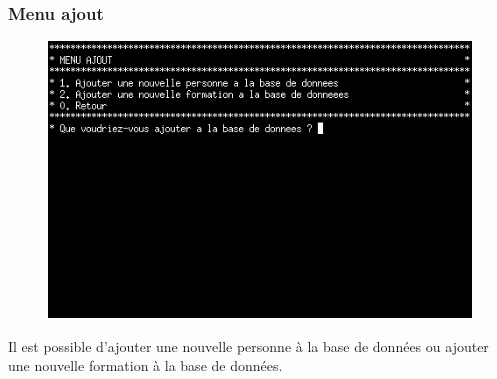 \documentclass[11pt]{article}
\begin{document}
\newpage
\subsubsection{Menu ajout}
\begin{figure}[ht]
  \centering
  \includegraphics[trim=0 210 0 0, clip, width=\textwidth]{images/06.png}
\end{figure}
Il est possible d'ajouter une nouvelle personne à la base de données ou ajouter une nouvelle formation à la base de données.
\end{document}

